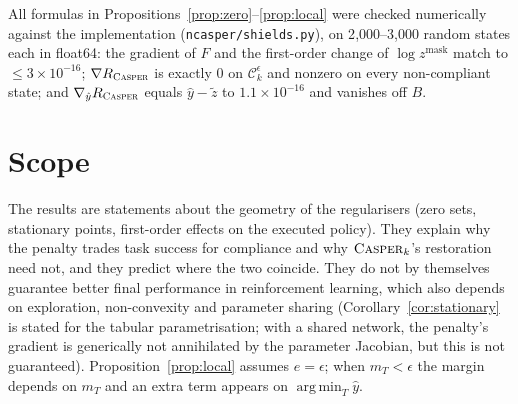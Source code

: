 \documentclass[11pt]{article}
\providecommand{\casper}{\textnormal{\textsc{Casper}}}
\newcommand{\yh}{\hat y}
\newcommand{\zt}{\tilde z}
\newcommand{\zm}{z^{\mathrm{mask}}}
\newcommand{\1}{\mathbf 1}
\newcommand{\Ck}{\mathcal C_k^{\epsilon}}
\newcommand{\Rc}{R_{\casper}}
\DeclareMathOperator*{\argmin}{arg\,min}
\theoremstyle{definition}
\theoremstyle{remark}
\begin{document}
All formulas in Propositions~\ref{prop:zero}--\ref{prop:local} were checked numerically against
the implementation (\texttt{ncasper/\allowbreak shields.py}), on 2{,}000--3{,}000 random states
each in float64:
the gradient of $F$ and the first-order change of $\log\zm$ match to $\le3\times10^{-16}$;
$\nabla\Rc$ is exactly $0$ on $\Ck$ and nonzero on every non-compliant state; and $\nabla_{\yh}\Rc$
equals $\yh-\zt$ to $1.1\times10^{-16}$ and vanishes off $B$.

\section{Scope}

The results are statements about the geometry of the regularisers (zero sets, stationary points,
first-order effects on the executed policy). They explain why the penalty trades task success for
compliance and why $\casper_k$'s restoration need not, and they predict where the two coincide.
They do not by themselves guarantee better final performance in reinforcement learning, which also
depends on exploration, non-convexity and parameter sharing (Corollary~\ref{cor:stationary} is stated
for the tabular parametrisation; with a shared network, the penalty's gradient is generically not
annihilated by the parameter Jacobian, but this is not guaranteed). Proposition~\ref{prop:local}
assumes $e=\epsilon$; when $m_T<\epsilon$ the margin depends on $m_T$ and an extra term appears on
$\argmin_T\yh$.
\end{document}

